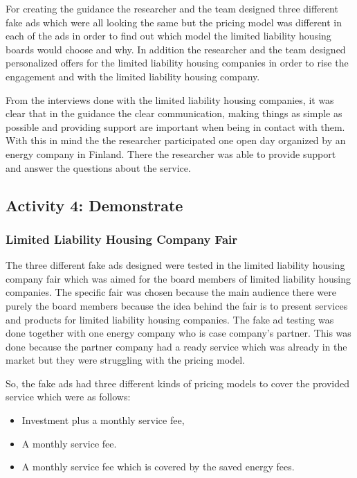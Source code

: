 For creating the guidance the researcher and the team designed three different fake ads which were all looking the same but the pricing model was different in each of the ads in order to find out which model the limited liability housing boards would choose and why. In addition the researcher and the team designed personalized offers for the limited liability housing companies in order to rise the engagement and with the limited liability housing company.

From the interviews done with the limited liability housing companies, it was clear that in the guidance the clear communication, making things as simple as possible and providing support are important when being in contact with them. With this in mind the the researcher participated one open day organized by an energy company in Finland. There the researcher was able to provide support and answer the questions about the service.

\subsection{Activity 4: Demonstrate}
\subsubsection*{Limited Liability Housing Company Fair}
The three different fake ads designed were tested in the limited liability housing company fair which was aimed for the board members of limited liability housing companies. The specific fair was chosen because the main audience there were purely the board members because the idea behind the fair is to present services and products for limited liability housing companies. The fake ad testing was done together with one energy company who is case company's partner. This was done because the partner company had a ready service which was already in the market but they were struggling with the pricing model.

So, the fake ads had three different kinds of pricing models to cover the provided service which were as follows:
\begin{itemize}
	\setlength{\itemsep}{2pt}
	\item Investment plus a monthly service fee,
	\item A monthly service fee.
	\item A monthly service fee which is covered by the saved energy fees.
\end{itemize}

